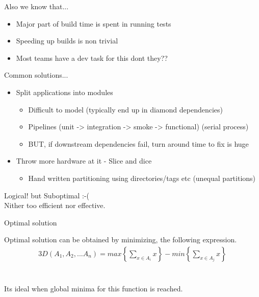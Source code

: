 \documentclass{beamer}
\begin{document}
\begin{frame}{Also we know that...}
  \begin{centering}
    \begin{itemize}
    \item Major part of build time is spent in running tests
      \pause
    \item Speeding up builds is non trivial
      \pause
    \item Most teams have a dev task for this dont they??
    \end{itemize}
  \end{centering}
\end{frame}

\begin{frame}{Common solutions...}
  \begin{centering}
    \begin{itemize}
    \item Split applications into modules
      \pause
      \begin{itemize}
      \item Difficult to model (typically end up in diamond dependencies)
        \pause
      \item Pipelines (unit -> integration -> smoke -> functional) (serial process)
        \pause
      \item BUT, if downstream dependencies fail, turn around time to fix is huge
      \end{itemize}      
      \pause
    \item Throw more hardware at it - Slice and dice
      \pause
      \begin{itemize}
      \item Hand written partitioning using directories/tags etc (unequal partitions)
      \end{itemize}
    \end{itemize}
  \end{centering}
  \pause
  Logical! but Suboptimal :-(\\
  \pause
  Nither too efficient nor effective.
\end{frame}

\begin{frame}{Optimal solution}
  \begin{center}
    Optimal solution can be obtained by minimizing, the following expression.\\
    \quad
    \begin{alignat}{3}
      D ( A_1, A_2, ... A_n) = max \left \{ \sum_{x \in A_i} x \right \} - min \left \{ \sum_{x \in A_j} x \right \}
    \end{alignat}\\
    \quad \\
    Its ideal when global minima for this function is reached.
  \end{center}
\end{frame}
\end{document}
